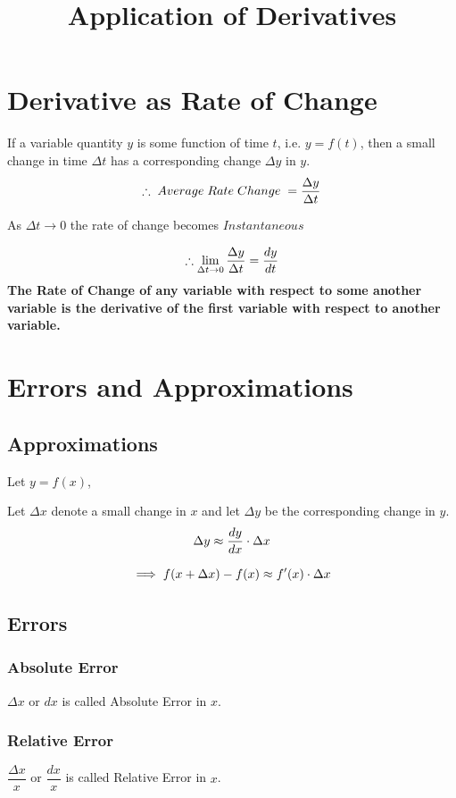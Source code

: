 \documentclass{article}
\title{Application of Derivatives}
\author{}
\date{}
\begin{document}
\maketitle

\section{Derivative as Rate of Change}
If a variable quantity $y$ is some function of time $t$, i.e. $y=f(t)$, then a small change in time $\Delta t$ has a corresponding change $\Delta y$ in $y$.
$$\therefore \hspace{1mm} Average \hspace{1mm} Rate \hspace{1mm} Change \hspace{1mm} = \dfrac{\Delta y}{\Delta t}$$

As $\Delta t \to 0$ the rate of change becomes $Instantaneous$

$$\therefore \lim\limits_{\Delta t \to 0}{\dfrac{\Delta y}{\Delta t}}=\dv{y}{t}$$
\textbf{The Rate of Change of any variable with respect to some another variable is the derivative of the first variable with respect to another variable.}

\section{Errors and Approximations}
\subsection*{Approximations}
Let $y=f(x)$,

Let $\Delta x$ denote a small change in $x$ and let $\Delta y$ be the corresponding change in $y.$
$$\Delta y \approx \dv{y}{x} \cdot \Delta x$$

$$\implies \hfill f(x+\Delta x)-f(x) \approx f'(x)\cdot \Delta x$$

\subsection*{Errors}
\subsubsection*{Absolute Error}
$\Delta x$ or $dx$ is called Absolute Error in $x$.

\subsubsection*{Relative Error}
$\dfrac{\Delta x}{x}$ or $\dfrac{dx}{x}$ is called Relative Error in $x$.
\end{document}
